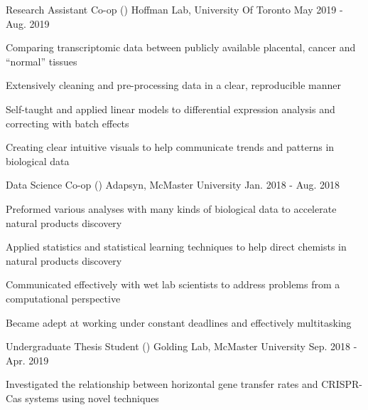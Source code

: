 \begin{cventries}
    \cventry
    {Research Assistant Co-op ()}
      {Hoffman Lab, University Of Toronto}
      {May 2019 - Aug. 2019}
      {}
      {
        \begin{cvitems}
         \item {Comparing transcriptomic data between publicly available placental, cancer and ``normal'' tissues}
         \item {Extensively cleaning and pre-processing data in a clear, reproducible manner}
         \item {Self-taught and applied linear models to differential expression analysis and correcting with batch effects}
         \item {Creating clear intuitive visuals to help communicate trends and patterns in biological data}
        \end{cvitems}
      }
    \cventry
      {Data Science Co-op ()}
      {Adapsyn, McMaster University}
      {Jan. 2018 - Aug. 2018}
      {}
      {
        \begin{cvitems}
         \item {Preformed various analyses with many kinds of biological data to accelerate natural products discovery}
         \item {Applied statistics and statistical learning techniques to help direct chemists in natural products discovery}
         \item {Communicated effectively with wet lab scientists to address problems from a computational perspective}
         \item {Became adept at working under constant deadlines and effectively multitasking}
        \end{cvitems}
      }
    \cventry
      {Undergraduate Thesis Student ()}
      {Golding Lab, McMaster University}
      {Sep. 2018 - Apr. 2019}
      {}
      {
        \begin{cvitems}
         \item {Investigated the relationship between horizontal gene transfer rates and CRISPR-Cas systems using novel techniques}

\end{cvitems}}
\end{cventries}
